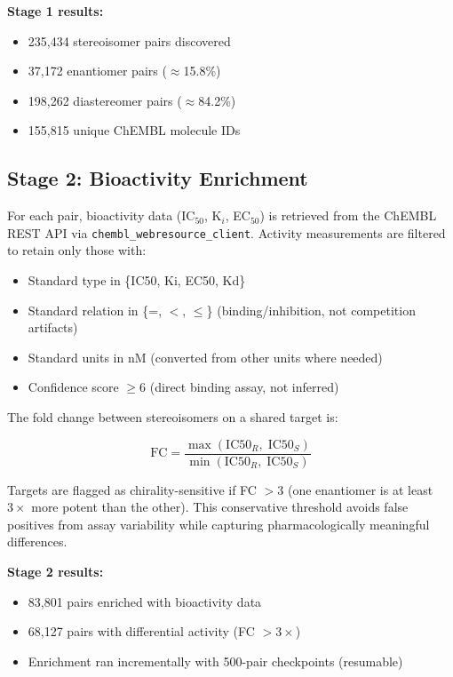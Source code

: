 \documentclass[11pt,a4paper]{article}
\begin{document}
\begin{keyresult}
\textbf{Stage 1 results:}
\begin{itemize}[leftmargin=1.5em, itemsep=2pt]
  \item 235,434 stereoisomer pairs discovered
  \item 37,172 enantiomer pairs ($\approx$15.8\%)
  \item 198,262 diastereomer pairs ($\approx$84.2\%)
  \item 155,815 unique ChEMBL molecule IDs
\end{itemize}
\end{keyresult}

\subsection{Stage 2: Bioactivity Enrichment}

For each pair, bioactivity data (IC$_{50}$, K$_i$, EC$_{50}$) is retrieved
from the ChEMBL REST API via \texttt{chembl\_webresource\_client}. Activity
measurements are filtered to retain only those with:

\begin{itemize}[leftmargin=1.5em]
  \item Standard type in \{IC50, Ki, EC50, Kd\}
  \item Standard relation in \{=, $<$, $\le$\} (binding/inhibition, not competition
    artifacts)
  \item Standard units in nM (converted from other units where needed)
  \item Confidence score $\ge 6$ (direct binding assay, not inferred)
\end{itemize}

The fold change between stereoisomers on a shared target is:

\begin{equation}
  \text{FC} = \frac{\max(\text{IC50}_R,\; \text{IC50}_S)}{\min(\text{IC50}_R,\; \text{IC50}_S)}
\end{equation}

Targets are flagged as chirality-sensitive if FC $> 3$ (one enantiomer is at
least $3\times$ more potent than the other). This conservative threshold avoids
false positives from assay variability while capturing pharmacologically
meaningful differences.

\begin{keyresult}
\textbf{Stage 2 results:}
\begin{itemize}[leftmargin=1.5em, itemsep=2pt]
  \item 83,801 pairs enriched with bioactivity data
  \item 68,127 pairs with differential activity (FC $> 3\times$)
  \item Enrichment ran incrementally with 500-pair checkpoints (resumable)
\end{itemize}
\end{keyresult}
\end{document}
